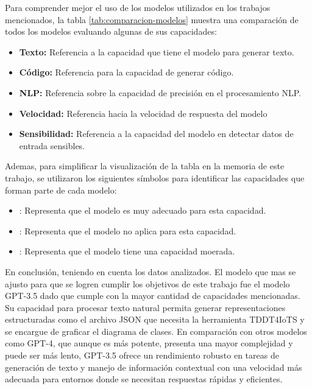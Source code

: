Para comprender mejor el uso de los modelos utilizados en los trabajos mencionados, la tabla \ref{tab:comparacion-modelos} muestra una comparación de todos los modelos evaluando algunas de sus capacidades:

\begin{itemize}
	\item \textbf{Texto:} Referencia a la capacidad que tiene el modelo para generar texto.
	\item \textbf{Código:} Referencia para la capacidad de generar código.
	\item \textbf{NLP:} Referencia sobre la capacidad de precisión en el procesamiento NLP.
	\item \textbf{Velocidad:} Referencia hacia la velocidad de respuesta del modelo
	\item \textbf{Sensibilidad:} Referencia a la capacidad del modelo en detectar datos de entrada sensibles.
\end{itemize}

Ademas, para simplificar la visualización de la tabla en la memoria de este trabajo, se utilizaron los siguientes símbolos para identificar las capacidades que forman parte de cada modelo:

\begin{itemize}
	\item {}: Representa que el modelo es muy adecuado para esta capacidad. 
	\item {}: Representa que el modelo no aplica para esta capacidad.
	\item \faMinus: Representa que el modelo tiene una capacidad moerada.
\end{itemize}



En conclusión, teniendo en cuenta los datos analizados. El modelo que mas se ajusto para que se logren cumplir los objetivos de este trabajo fue el modelo GPT-3.5 dado que cumple con la mayor cantidad de capacidades mencionadas. Su capacidad para procesar texto natural permita generar representaciones estructuradas como el archivo JSON que necesita  la herramienta TDDT4IoTS y se encargue de graficar el diagrama de clases. En comparación con otros modelos como GPT-4, que aunque es más potente, presenta una mayor complejidad y puede ser más lento, GPT-3.5 ofrece un rendimiento robusto en tareas de generación de texto y manejo de información contextual con una velocidad más adecuada para entornos donde se necesitan respuestas rápidas y eficientes.


